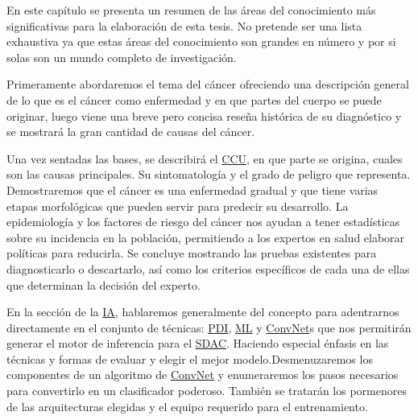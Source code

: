 En este capítulo se presenta un resumen de las áreas del conocimiento más
significativas para la elaboración de esta tesis. No pretende ser una lista
exhaustiva ya que estas áreas del conocimiento son grandes en número y por si
solas son un mundo completo de investigación. 

Primeramente abordaremos el tema del cáncer ofreciendo una descripción general
de lo que es el cáncer como enfermedad y en que partes del cuerpo se puede
originar, luego viene una breve pero concisa reseña histórica de su diagnóstico
y se mostrará la gran cantidad de causas del cáncer.

Una vez sentadas las bases, se describirá el \hyperlink{abbr}{CCU}, en que parte
se origina, cuales son las causas principales. Su sintomatología y el grado de
peligro que representa. Demostraremos que el cáncer es una enfermedad gradual y
que tiene varias etapas morfológicas que pueden servir para predecir su
desarrollo. La epidemiología y los factores de riesgo del cáncer nos ayudan a
tener estadísticas sobre su incidencia en la población, permitiendo a los
expertos en salud elaborar políticas para reducirla. Se concluye mostrando las
pruebas existentes para diagnosticarlo o descartarlo, así como los criterios
específicos de cada una de ellas que determinan la decisión del experto.

En la sección de la \hyperlink{abbr}{IA}, hablaremos generalmente del concepto
para adentrarnos directamente en el conjunto de técnicas: \hyperlink{abbr}{PDI},
\hyperlink{abbr}{ML} y \hyperlink{abbr}{ConvNet}s que nos permitirán generar el
motor de inferencia para el \hyperlink{abbr}{SDAC}. Haciendo especial énfasis en
las técnicas y formas de evaluar y elegir el mejor modelo.Desmenuzaremos los
componentes de un algoritmo de \hyperlink{abbr}{ConvNet} y enumeraremos los
pasos necesarios para convertirlo en un clasificador poderoso. También se
tratarán los pormenores de las arquitecturas elegidas y el equipo requerido para
el entrenamiento.